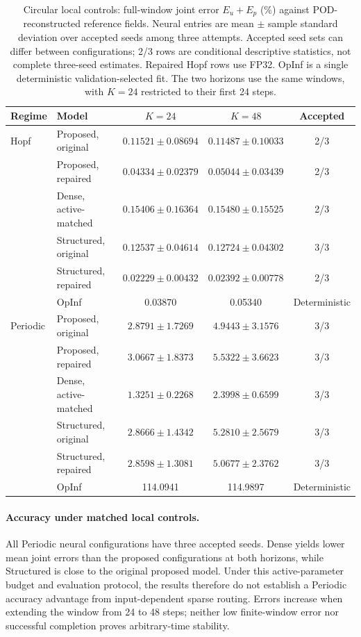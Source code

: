\begin{table}[t]
\centering
\small
\setlength{\tabcolsep}{4pt}
\caption{Circular local controls: full-window joint error
$E_u+E_p$ (\%) against POD-reconstructed reference fields.
Neural entries are mean $\pm$ sample standard deviation over accepted
seeds among three attempts. Accepted seed sets can differ between
configurations; 2/3 rows are conditional descriptive statistics,
not complete three-seed estimates. Repaired Hopf rows use FP32.
OpInf is a single deterministic validation-selected fit.
The two horizons use the same windows, with $K=24$ restricted to
their first 24 steps.}
\label{tab:circular_full_reorg}
\begin{tabular}{@{}llccc@{}}
\toprule
Regime & Model & $K=24$ & $K=48$ & Accepted\\
\midrule
Hopf & Proposed, original
& $0.11521\pm0.08694$ & $0.11487\pm0.10033$ & 2/3\\
& Proposed, repaired
& $0.04334\pm0.02379$ & $0.05044\pm0.03439$ & 2/3\\
& Dense, active-matched
& $0.15406\pm0.16364$ & $0.15480\pm0.15525$ & 2/3\\
& Structured, original
& $0.12537\pm0.04614$ & $0.12724\pm0.04302$ & 3/3\\
& Structured, repaired
& $0.02229\pm0.00432$ & $0.02392\pm0.00778$ & 2/3\\
& OpInf & 0.03870 & 0.05340 & Deterministic\\
\midrule
Periodic & Proposed, original
& $2.8791\pm1.7269$ & $4.9443\pm3.1576$ & 3/3\\
& Proposed, repaired
& $3.0667\pm1.8373$ & $5.5322\pm3.6623$ & 3/3\\
& Dense, active-matched
& $\mathbf{1.3251\pm0.2268}$ & $\mathbf{2.3998\pm0.6599}$ & 3/3\\
& Structured, original
& $2.8666\pm1.4342$ & $5.2810\pm2.5679$ & 3/3\\
& Structured, repaired
& $2.8598\pm1.3081$ & $5.0677\pm2.3762$ & 3/3\\
& OpInf & 114.0941 & 114.9897 & Deterministic\\
\bottomrule
\end{tabular}
\end{table}

\paragraph{Accuracy under matched local controls.}
All Periodic neural configurations have three accepted seeds.
Dense yields lower mean joint errors than the proposed configurations
at both horizons, while Structured is close to the original proposed
model. Under this active-parameter budget and evaluation protocol,
the results therefore do not establish a Periodic accuracy advantage
from input-dependent sparse routing. Errors increase when extending
the window from 24 to 48 steps; neither low finite-window error nor
successful completion proves arbitrary-time stability.

